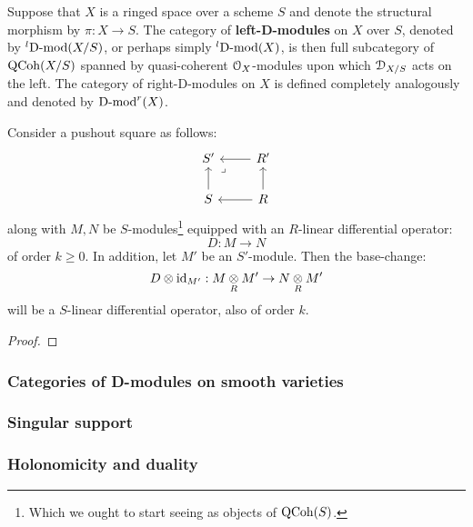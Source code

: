             \begin{definition}[D-modules] \label{def: D_modules}
                Suppose that $X$ is a ringed space over a scheme $S$ and denote the structural morphism by $\pi: X \to S$. The category of \textbf{left-D-modules} on $X$ over $S$, denoted by ${}^l\mathrm{D}\text{-}\mathrm{mod}(X/S)$, or perhaps simply ${}^l\mathrm{D}\text{-}\mathrm{mod}(X)$, is then full subcategory of $\mathrm{QCoh}(X/S)$ spanned by quasi-coherent $\mathcal{O}_X$-modules upon which $\mathcal{D}_{X/S}$ acts on the left. The category of right-D-modules on $X$ is defined completely analogously and denoted by $\mathrm{D}\text{-}\mathrm{mod}^r(X)$. 
            \end{definition}
            \begin{remark}
                
            \end{remark}
            \begin{proposition} \label{prop: base_changing_differential_operators}
                Consider a pushout square as follows:
                    $$
                        \begin{tikzcd}
                        	{S'} & {R'} \\
                        	S & R
                        	\arrow[from=2-2, to=2-1]
                        	\arrow[from=2-1, to=1-1]
                        	\arrow[from=2-2, to=1-2]
                        	\arrow[from=1-2, to=1-1]
                        	\arrow["\lrcorner"{anchor=center, pos=0.125}, draw=none, from=1-1, to=2-2]
                        \end{tikzcd}
                    $$
                along with $M, N$ be $S$-modules\footnote{Which we ought to start seeing as objects of $\mathrm{QCoh}(S)$.} equipped with an $R$-linear differential operator:
                    $$D: M \to N$$
                of order $k \geq 0$. In addition, let $M'$ be an $S'$-module. Then the base-change:
                    $$D \tensor \id_{M'}: M \tensor_R M' \to N \tensor_R M'$$
                will be a $S$-linear differential operator, also of order $k$.
            \end{proposition}
                \begin{proof}
                    
                \end{proof}
    
        \subsubsection{Categories of D-modules on smooth varieties}
        
        \subsubsection{Singular support}
        
        \subsubsection{Holonomicity and duality}